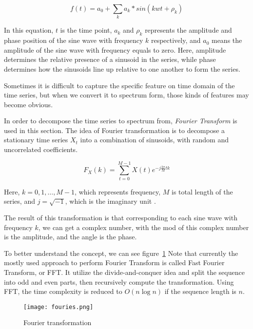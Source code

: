 \documentclass[letterpaper,12pt]{article}
\begin{document}
\begin{equation} \label{eq:sin} %
f(t) = a_0 + \sum_k{a_k * sin(kwt+\rho_k)}
\end{equation}

In this equation, $t$ is the time point, $a_k$ and $\rho_k$ represents the amplitude and phase position of the sine wave with frequency $k$ respectively, and $a_0$ means the amplitude of the sine wave with frequency equals to zero. Here, amplitude determines the relative presence of a sinusoid in the series, while phase determines how the sinusoids line up relative to one another to form the series.

Sometimes it is difficult to capture the specific feature on time domain of the time series, but when we convert it to spectrum form, those kinds of features may become obvious\cite{priestley1981spectral}.

In order to decompose the time series to spectrum from, \textit{Fourier Transform} is used in this section. The idea of Fourier transformation is to decompose a stationary time series $X_{t}$ into a combination of sinusoids, with random and uncorrelated coefficients\cite{bracewell1986fourier}.

\begin{equation} \label{eq:fourier} 
F_{X}(k) = \sum_{t=0}^{M-1}X(t)e^{-j \frac{2\pi}{M} t k}
\end{equation}

Here, $k = 0, 1, \ldots, M-1$, which represents frequency, $M$ is total length of the series, and $j = \sqrt{-1}$, which is the imaginary unit .

The result of this transformation is that corresponding to each sine wave with frequency $k$, we can get a complex number, with the mod of this complex number is the amplitude, and the angle is the phase.

To better understand the concept, we can see figure~\ref{fig:fouries}
Note that currently the mostly used approach to perform Fourier Transform is called Fast Fourier Transform, or FFT. It utilize the divide-and-conquer idea and split the sequence into odd and even parts, then recursively compute the transformation. Using FFT, the time complexity is reduced to $O(n \log n)$ if the sequence length is $n$.

\begin{figure}[ht] 
\centering \texttt{[image: fouries.png]}
\caption{\label{fig:fouries}Fourier transformation}
\end{figure}
\end{document}
